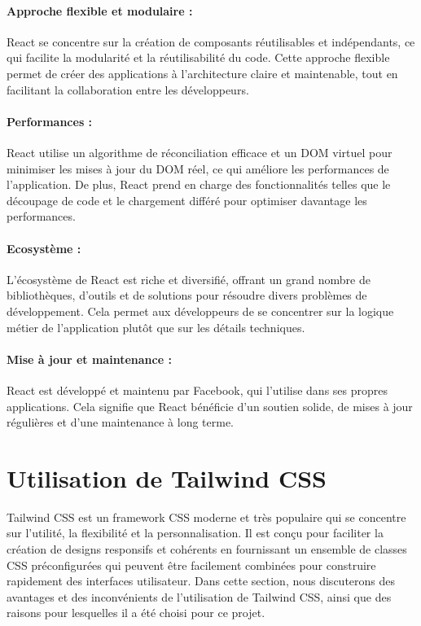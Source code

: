 \paragraph{Approche flexible et modulaire :} React se concentre sur la création de composants réutilisables et indépendants, ce qui facilite la modularité et la réutilisabilité du code. Cette approche flexible permet de créer des applications à l'architecture claire et maintenable, tout en facilitant la collaboration entre les développeurs.
\paragraph{Performances :} React utilise un algorithme de réconciliation efficace et un DOM virtuel pour minimiser les mises à jour du DOM réel, ce qui améliore les performances de l'application. De plus, React prend en charge des fonctionnalités telles que le découpage de code et le chargement différé pour optimiser davantage les performances.

\paragraph{Ecosystème :} L'écosystème de React est riche et diversifié, offrant un grand nombre de bibliothèques, d'outils et de solutions pour résoudre divers problèmes de développement. Cela permet aux développeurs de se concentrer sur la logique métier de l'application plutôt que sur les détails techniques.

\paragraph{Mise à jour et maintenance :} React est développé et maintenu par Facebook, qui l'utilise dans ses propres applications. Cela signifie que React bénéficie d'un soutien solide, de mises à jour régulières et d'une maintenance à long terme.

\section{Utilisation de Tailwind CSS}

Tailwind CSS\cite{InstallationTailwindCSS} est un framework CSS moderne et très populaire qui se concentre sur l'utilité, la flexibilité et la personnalisation. Il est conçu pour faciliter la création de designs responsifs et cohérents en fournissant un ensemble de classes CSS préconfigurées qui peuvent être facilement combinées pour construire rapidement des interfaces utilisateur. Dans cette section, nous discuterons des avantages et des inconvénients de l'utilisation de Tailwind CSS, ainsi que des raisons pour lesquelles il a été choisi pour ce projet.

